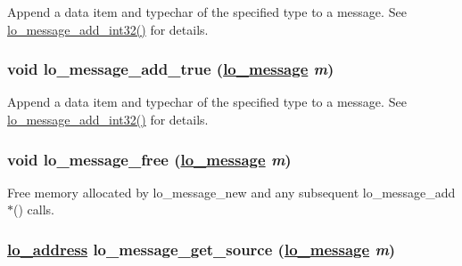 Append a data item and typechar of the specified type to a message. See \hyperlink{group__liblolowlevel_g31ac1e4c0ec6c61f665ce3f9bbdc53c3}{lo\_\-message\_\-add\_\-int32()} for details. 

\hypertarget{group__liblolowlevel_g079bba28d38b8e5f83cc7498574eadb3}{
\subsubsection[lo\_\-message\_\-add\_\-true]{\setlength{\rightskip}{0pt plus 5cm}void lo\_\-message\_\-add\_\-true (\hyperlink{lo__types_8h_d126083c98d941f00eb72d1690b38d63}{lo\_\-message} {\em m})}}
\label{group__liblolowlevel_g079bba28d38b8e5f83cc7498574eadb3}


Append a data item and typechar of the specified type to a message. See \hyperlink{group__liblolowlevel_g31ac1e4c0ec6c61f665ce3f9bbdc53c3}{lo\_\-message\_\-add\_\-int32()} for details. 

\hypertarget{group__liblolowlevel_g93d3687e77ae20167b82830c917a3e50}{
\subsubsection[lo\_\-message\_\-free]{\setlength{\rightskip}{0pt plus 5cm}void lo\_\-message\_\-free (\hyperlink{lo__types_8h_d126083c98d941f00eb72d1690b38d63}{lo\_\-message} {\em m})}}
\label{group__liblolowlevel_g93d3687e77ae20167b82830c917a3e50}


Free memory allocated by lo\_\-message\_\-new and any subsequent lo\_\-message\_\-add$\ast$() calls. 

\hypertarget{group__liblolowlevel_g1f4e07e4f8b67edc98f4b300412a3dbb}{
\subsubsection[lo\_\-message\_\-get\_\-source]{\setlength{\rightskip}{0pt plus 5cm}\hyperlink{lo__types_8h_bf9b53223467de596b89e1377b0f3f3d}{lo\_\-address} lo\_\-message\_\-get\_\-source (\hyperlink{lo__types_8h_d126083c98d941f00eb72d1690b38d63}{lo\_\-message} {\em m})}}
\label{group__liblolowlevel_g1f4e07e4f8b67edc98f4b300412a3dbb}


